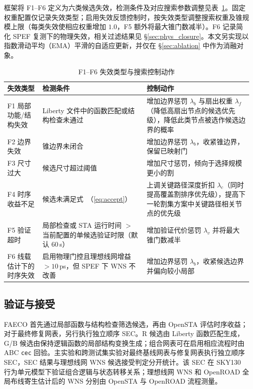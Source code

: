 \documentclass[twocolumn,10pt,fontset=windows]{ctexart}
\renewcommand{\eqref}[1]{\textup{（\ref{#1}）}}
\begin{document}
\FloatBarrier
框架将 F1--F6 定义为六类候选失效，检测条件及对应搜索参数调整见表~\ref{tab:failures}。固定权重配置仅记录失效类型；启用失效反馈控制时，按失效类型调整搜索权重及锥规模上限（每类失效使相应权重增加 $1.0$，F5 额外将最大锥门数减半）。F6 记录简化 SPEF 复测下的物理失效，相关过滤结果见 \S\ref{sec:phys_closure}。本文另实现以指数滑动平均（EMA）平滑的自适应更新，并仅在 \S\ref{sec:ablation} 中作为消融对象。

\begin{table}[!htbp]
\centering
\caption{F1--F6 失效类型与搜索控制动作}
\label{tab:failures}
\scriptsize
\setlength{\tabcolsep}{2pt}
\begin{tabular}{p{2.0cm}p{2.6cm}p{2.9cm}}
\toprule
\textbf{失效类型} & \textbf{检测条件} & \textbf{控制动作} \\
\midrule
F1 局部功能/结构失效 & Liberty 文件中的函数匹配或结构检查未通过 & 增加边界惩罚 $\lambda_b$ 与扇出权重 $\lambda_f$（降低高扇出节点的候选优先级），降低此类节点被选作候选边界的概率 \\
F2 边界失效 & 锥边界未闭合 & 增加边界惩罚 $\lambda_b$，收紧锥边界，保留已映射门 \\
F3 尺寸过大 & 候选尺寸超过阈值 & 增加尺寸惩罚，倾向于选择规模更小的割 \\
F4 时序收益不足 & 候选未满足式~\eqref{eq:accept} & 上调关键路径深度折扣 $\lambda_c$（同时提高覆盖割排序优先级），提高下一轮割集方案中关键路径相关节点的优先级 \\
F5 验证超时 & 局部检查或 STA 运行时间 $>$ 当前配置的单候选验证时限（默认 $60\,$s） & 增加验证代价惩罚 $\lambda_v$ 并将最大锥门数减半 \\
F6 线载估计下的时序失效 & 启用物理门控且理想线网增益 $>10\,$ps，但 SPEF 下 WNS 不改善 & 增加边界惩罚 $\lambda_b$，收紧候选边界并偏向较小局部 \\
\bottomrule
\end{tabular}
\end{table}

\subsection{验证与接受}\label{sec:validation}
FAECO 首先通过局部函数与结构检查筛选候选，再由 OpenSTA 评估时序收益；对于最终修复网表，另行执行独立顺序 SEC。R 候选由 Liberty 函数匹配生成，G/B 候选由保持逻辑函数的局部结构变换生成；组合网表可在启用相应流程时由 ABC \texttt{cec} 回验。主实验和跨测试集实验对最终基线网表与修复网表执行独立顺序 SEC，SEC 结果与理想线网 WNS 候选接受判定分开统计。该 SEC 在 SKY130 行为单元模型下验证组合逻辑与状态转移关系；理想线网 WNS 和 OpenROAD 全局布线寄生估计后的 WNS 分别由 OpenSTA 与 OpenROAD 流程测量。
\end{document}
